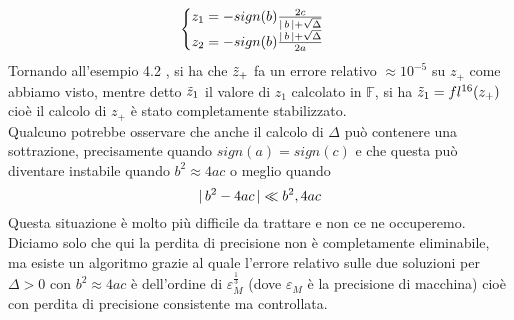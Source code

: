 \[ \begin{cases}
    z_1 = - sign(b)\frac{2c}{\lvert\,b\,\rvert + \sqrt{\Delta}} \\
    z_2 = - sign(b)\frac{\lvert\,b\,\rvert + \sqrt{\Delta}}{2a}
\end{cases}\]
Tornando all'esempio 4.2 , si ha che $\Tilde{z}_+$ fa un errore relativo $\approx 10^{-5}$ su $z_+$ come abbiamo visto, mentre detto $\Tilde{z}_1$ il valore di $z_1$ calcolato in $\mathbb{F}$, si ha $\Tilde{z}_1 = fl^{16}(z_+)$ cioè il calcolo di $z_+$ è stato completamente stabilizzato.\\
Qualcuno potrebbe osservare che anche il calcolo di $\Delta$ può contenere una sottrazione, precisamente quando $sign(a)=sign(c)$ e che questa può diventare instabile quando $b^2 \approx 4ac$ o meglio quando 
\[\lvert\,b^2 - 4ac\,\rvert \ll b^2,4ac\]
Questa situazione è molto più difficile da trattare e non ce ne occuperemo.\\ Diciamo solo che qui la perdita di precisione non è completamente eliminabile, ma esiste un algoritmo grazie al quale l'errore relativo sulle due soluzioni per $\Delta>0$ con $b^2 \approx 4ac$ è dell'ordine di $\varepsilon_M^{\frac{1}{3}}$ (dove $\varepsilon_M$ è la precisione di macchina) cioè con perdita di precisione consistente ma controllata.
\newpage